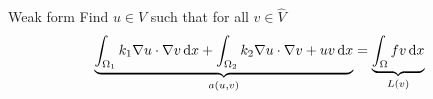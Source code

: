 \begin{frame}[shrink=20]
\begin{columns}[t]
\begin{column}{0.5\textwidth}
{\begin{block}{Weak form}
          Find $u \in V$ such that for all $v \in \widehat{V}$
          \begin{equation*}
            \underbrace{
              \int_{\Omega_1} k_1 \nabla u \cdot \nabla v \, \mathrm{d}x
             +\int_{\Omega_2} k_2 \nabla u \cdot \nabla v  + uv \, \mathrm{d}x
            }_{a(u,v)}
            = \underbrace{
                \int_{\Omega} f v \, \mathrm{d}x
            }_{L(v)}
          \end{equation*}
        \end{block}
      }
      \end{column}
    \end{columns}
  \end{frame}
